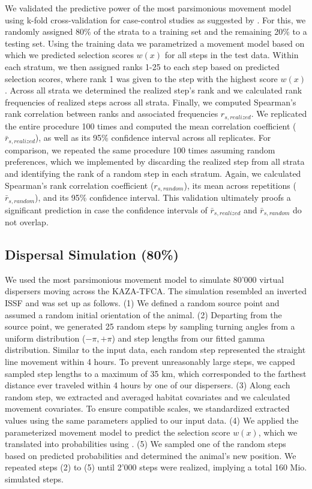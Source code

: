 \documentclass[abstract=on,10pt,a4paper,bibliography=totocnumbered]{article}
\begin{document}
We validated the predictive power of the most parsimonious movement model using
k-fold cross-validation for case-control studies as suggested by
\cite{Fortin.2009}. For this, we randomly assigned 80\% of the strata to a
training set and the remaining 20\% to a testing set. Using the training data we
parametrized a movement model based on which we predicted selection scores
\(w(x)\) for all steps in the test data. Within each stratum, we then assigned
ranks 1-25 to each step based on predicted selection scores, where rank 1 was
given to the step with the highest score \(w(x)\). Across all strata we
determined the realized step's rank and we calculated rank frequencies of
realized steps across all strata. Finally, we computed Spearman's rank
correlation between ranks and associated frequencies \(r_{s, realized}\). We
replicated the entire procedure 100 times and computed the mean correlation
coefficient (\(\bar{r}_{s, realized}\)), as well as its 95\% confidence interval
across all replicates. For comparison, we repeated the same procedure 100 times
assuming random preferences, which we implemented by discarding the realized
step from all strata and identifying the rank of a random step in each stratum.
Again, we calculated Spearman's rank correlation coefficient (\(r_{s,
random}\)), its mean across repetitions (\(\bar{r}_{s, random}\)), and its 95\%
confidence interval. This validation ultimately proofs a significant prediction
in case the confidence intervals of \(\bar{r}_{s, realized}\) and \(\bar{r}_{s,
random}\) do not overlap.

\subsection{Dispersal Simulation (80\%)}
We used the most parsimonious movement model to simulate 80'000 virtual
dispersers moving across the KAZA-TFCA. The simulation resembled an inverted
ISSF and was set up as follows. (1) We defined a random source point and assumed
a random initial orientation of the animal. (2) Departing from the source point,
we generated 25 random steps by sampling turning angles from a uniform
distribution (\(-\pi, +\pi\)) and step lengths from our fitted gamma
distribution. Similar to the input data, each random step represented the
straight line movement within 4 hours. To prevent unreasonably large steps, we
capped sampled step lengths to a maximum of 35 km, which corresponded to the
farthest distance ever traveled within 4 hours by one of our dispersers. (3)
Along each random step, we extracted and averaged habitat covariates and we
calculated movement covariates. To ensure compatible scales, we standardized
extracted values using the same parameters applied to our input data. (4) We
applied the parameterized movement model to predict the selection score
\(w(x)\), which we translated into probabilities using . (5) We
sampled one of the random steps based on predicted probabilities and determined
the animal's new position. We repeated steps (2) to (5) until 2'000 steps were
realized, implying a total 160 Mio. simulated steps.
\end{document}
